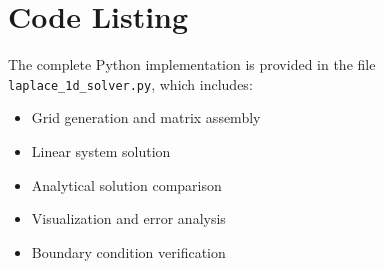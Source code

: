 \documentclass[11pt,a4paper]{article}
\begin{document}
\section{Code Listing}

The complete Python implementation is provided in the file \texttt{laplace\_1d\_solver.py}, which includes:
\begin{itemize}
\item Grid generation and matrix assembly
\item Linear system solution
\item Analytical solution comparison
\item Visualization and error analysis
\item Boundary condition verification
\end{itemize}
\end{document}
